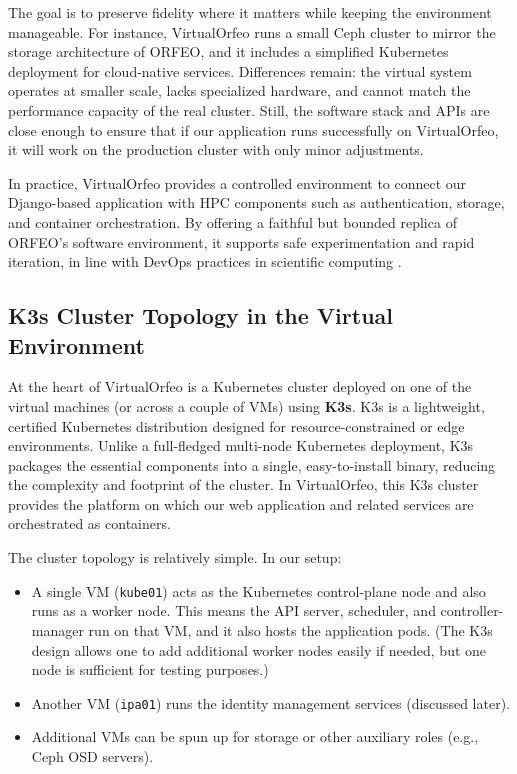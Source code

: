 The goal is to preserve fidelity where it matters while keeping the environment manageable. For instance, VirtualOrfeo runs a small Ceph cluster to mirror the storage architecture of ORFEO, and it includes a simplified Kubernetes deployment for cloud-native services. Differences remain: the virtual system operates at smaller scale, lacks specialized hardware, and cannot match the performance capacity of the real cluster. Still, the software stack and APIs are close enough to ensure that if our application runs successfully on VirtualOrfeo, it will work on the production cluster with only minor adjustments.

\medskip

In practice, VirtualOrfeo provides a controlled environment to connect our Django-based application with HPC components such as authentication, storage, and container orchestration. By offering a faithful but bounded replica of ORFEO’s software environment, it supports safe experimentation and rapid iteration, in line with DevOps practices in scientific computing \parencite{Ohmura2023TwdsDT}.


\subsection{K3s Cluster Topology in the Virtual Environment}

At the heart of VirtualOrfeo is a Kubernetes cluster deployed on one of the 
virtual machines (or across a couple of VMs) using \textbf{K3s}. K3s is a 
lightweight, certified Kubernetes distribution designed for resource-constrained 
or edge environments\parencite{Rancher2021K3s}. Unlike a full-fledged multi-node 
Kubernetes deployment, K3s packages the essential components into a single, 
easy-to-install binary, reducing the complexity and footprint of the cluster. In 
VirtualOrfeo, this K3s cluster provides the platform on which our web application 
and related services are orchestrated as containers.

\medskip

The cluster topology is relatively simple. In our setup:  
\begin{itemize}
	\item A single VM (\texttt{kube01}) acts as the Kubernetes control-plane node 
	and also runs as a worker node. This means the API server, scheduler, and 
	controller-manager run on that VM, and it also hosts the application pods. 
	(The K3s design allows one to add additional worker nodes easily if needed, 
	but one node is sufficient for testing purposes.)
	\item Another VM (\texttt{ipa01}) runs the identity management services 
	(discussed later).
	\item Additional VMs can be spun up for storage or other auxiliary roles 
	(e.g., Ceph OSD servers).
\end{itemize}

